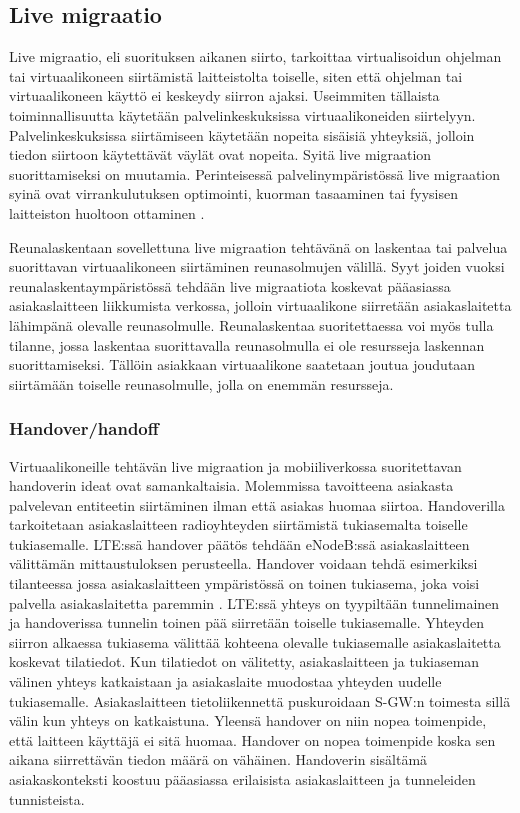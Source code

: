 \subsection{Live migraatio} \label{livemigraatio}

Live migraatio, eli suorituksen aikanen siirto, tarkoittaa virtualisoidun ohjelman tai virtuaalikoneen siirtämistä laitteistolta toiselle, siten että ohjelman tai virtuaalikoneen käyttö ei keskeydy siirron ajaksi. 
Useimmiten tällaista toiminnallisuutta käytetään palvelinkeskuksissa virtuaalikoneiden
siirtelyyn. Palvelinkeskuksissa siirtämiseen käytetään nopeita sisäisiä yhteyksiä,
jolloin tiedon siirtoon käytettävät väylät ovat nopeita. Syitä live migraation
suorittamiseksi on muutamia. Perinteisessä palvelinympäristössä live migraation
syinä ovat virrankulutuksen optimointi, kuorman tasaaminen tai fyysisen
laitteiston huoltoon ottaminen \cite{soni2013comparative}. 

Reunalaskentaan sovellettuna live migraation tehtävänä on laskentaa tai palvelua suorittavan virtuaalikoneen siirtäminen reunasolmujen välillä.
Syyt joiden vuoksi reunalaskentaympäristössä tehdään live migraatiota koskevat pääasiassa asiakaslaitteen liikkumista verkossa, jolloin virtuaalikone siirretään asiakaslaitetta lähimpänä olevalle  reunasolmulle. 
Reunalaskentaa suoritettaessa voi myös tulla tilanne, jossa laskentaa suorittavalla reunasolmulla ei ole resursseja laskennan suorittamiseksi. Tällöin asiakkaan virtuaalikone saatetaan joutua joudutaan siirtämään toiselle reunasolmulle, jolla on enemmän resursseja.  


\subsubsection*{Handover/handoff}%
Virtuaalikoneille tehtävän live migraation ja mobiiliverkossa suoritettavan handoverin ideat ovat samankaltaisia. Molemmissa tavoitteena asiakasta palvelevan entiteetin siirtäminen ilman että asiakas huomaa siirtoa.
Handoverilla tarkoitetaan asiakaslaitteen radioyhteyden siirtämistä tukiasemalta toiselle tukiasemalle. 
LTE:ssä handover päätös tehdään eNodeB:ssä asiakaslaitteen välittämän mittaustuloksen perusteella. 
Handover voidaan tehdä esimerkiksi tilanteessa jossa asiakaslaitteen ympäristössä on toinen tukiasema, joka voisi palvella asiakaslaitetta paremmin \cite[s.~96]{etsilte}.
LTE:ssä yhteys on tyypiltään tunnelimainen ja handoverissa tunnelin toinen pää siirretään toiselle tukiasemalle.
Yhteyden siirron alkaessa tukiasema välittää kohteena olevalle tukiasemalle asiakaslaitetta koskevat tilatiedot. Kun tilatiedot on välitetty, asiakaslaitteen ja tukiaseman välinen yhteys katkaistaan ja asiakaslaite muodostaa yhteyden uudelle tukiasemalle.
Asiakaslaitteen tietoliikennettä puskuroidaan S-GW:n toimesta sillä välin kun yhteys on katkaistuna. Yleensä handover on niin nopea toimenpide, että laitteen käyttäjä ei sitä huomaa.
Handover on nopea toimenpide koska sen aikana siirrettävän tiedon määrä on vähäinen.
Handoverin sisältämä asiakaskonteksti koostuu pääasiassa erilaisista asiakaslaitteen ja tunneleiden tunnisteista.

